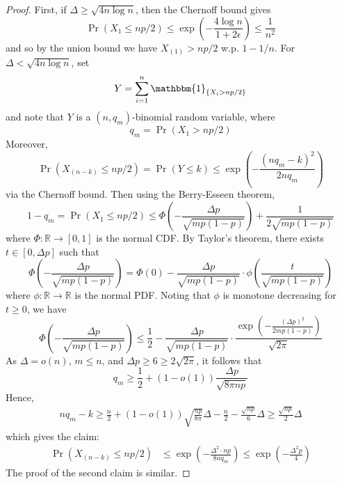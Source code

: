 \documentclass{article}
\theoremstyle{remark}
\newcommand{\R}{\mathbb{R}}
\newcommand{\1}{\mathbbm{1}}
\begin{document}
\begin{proof}
    First, if $\Delta \ge \sqrt{4 n \log n}$, then the Chernoff bound gives
    \[\Pr(X_1 \le np / 2) \le \exp\left(-\frac{4 \log n}{1 + 2 \epsilon}\right) \le \frac{1}{n^2}\]
    and so by the union bound we have $X_{(1)} > np/2$ w.p. $1 - 1/n$. For $\Delta < \sqrt{4n \log n}$,
    set
    \[Y = \sum_{i=1}^n \1_{\{X_i > np / 2\}}\]
    and note that $Y$ is a $(n, q_m)$-binomial random variable, where
    \[q_m = \Pr(X_1 > np / 2)\]
    Moreover,
    \[\Pr(X_{(n-k)} \le np / 2) = \Pr(Y \le k) \le \exp\left(-\frac{(n q_m - k)^2}{2n q_m}\right)\]
    via the Chernoff bound. Then using the Berry-Esseen theorem,
    \[1 - q_m = \Pr(X_1 \le np / 2) \le \Phi\left( -\frac{\Delta p}{\sqrt{mp(1-p)}}\right) + \frac{1}{2\sqrt{m p (1-p)}}\]
    where $\Phi \colon \R \to [0, 1]$ is the normal CDF. By Taylor's theorem, there exists $t \in [0, \Delta p]$ such that
    \[\Phi\left( -\frac{\Delta p}{\sqrt{mp(1-p)}}\right) = \Phi(0) - \frac{\Delta p}{\sqrt{mp(1-p)}} \cdot \phi \left(\frac{t}{\sqrt{mp(1-p)}}\right)\]
    where $\phi \colon \R \to \R$ is the normal PDF.
    Noting that $\phi$ is monotone decreasing for $t \ge 0$, we have
    \[\Phi\left( -\frac{\Delta p}{\sqrt{mp(1-p)}}\right) \le \frac{1}{2} - \frac{\Delta p}{\sqrt{mp(1-p)}} \cdot \frac{\exp\left(- \frac{(\Delta p)^2}{2 mp(1-p)}\right)}{\sqrt{2\pi}}\]
    As $\Delta = o(n)$, $m \le n$, and $\Delta p \ge 6 \ge 2 \sqrt{2 \pi}$, it follows that
    \[q_m \ge \frac{1}{2} + (1 - o(1)) \frac{\Delta p}{\sqrt{8 \pi np}}\]
    Hence,
    \begin{align*}
        n q_m - k \ge \frac{n}{2} + (1 - o(1)) \sqrt{\frac{np}{8 \pi}} \Delta - \frac{n}{2} - \frac{\sqrt{np}}{6} \Delta \ge \frac{\sqrt{np}}{2} \Delta
    \end{align*}
    which gives the claim:
    \begin{align*}
        \Pr(X_{(n-k)} \le np / 2) &\le \exp\left(-\frac{\Delta^2 \cdot np}{8 n q_m}\right) \le \exp\left(-\frac{\Delta^2 p}{4}\right)
    \end{align*}
    The proof of the second claim is similar.
\end{proof}
\end{document}
